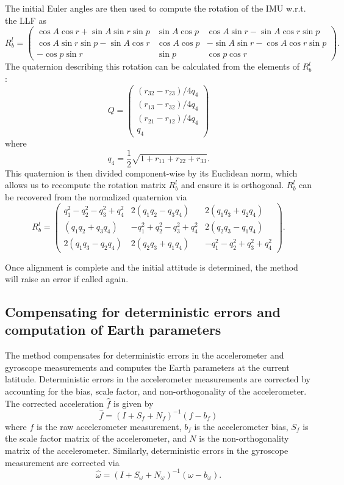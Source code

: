 \documentclass[11pt, oneside]{article}   	%
\begin{document}
The initial Euler angles are then used to compute the rotation of the IMU w.r.t. the LLF as
$$ R_b^l=\begin{pmatrix}
\cos A \cos r + \sin A \sin r \sin p & \sin A \cos p & \cos A \sin r - \sin A \cos r \sin p \\
\cos A \sin r \sin p - \sin A \cos r & \cos A \cos p & -\sin A \sin r - \cos A \cos r \sin p \\
-\cos p \sin r & \sin p & \cos p \cos r
\end{pmatrix}.$$
The quaternion describing this rotation can be calculated from the elements of $R_b^l$:
$$Q=\begin{pmatrix}
(r_{32}-r_{23})/4q_4 \\
(r_{13}-r_{32})/4q_4 \\
(r_{21}-r_{12})/4q_4 \\
q_4
\end{pmatrix}$$
where
$$q_4=\frac12\sqrt{1+r_{11}+r_{22}+r_{33}}.$$
This quaternion is then divided component-wise by its Euclidean norm, which allows us to recompute the rotation matrix $R_b^l$ and ensure it is orthogonal.  $R_b^l$ can be recovered from the normalized quaternion via
$$ R_b^l=\begin{pmatrix}
q_1^2-q_2^2-q_3^2+q_4^2 & 2(q_1q_2-q_3q_4) & 2(q_1q_3+q_2q_4) \\
(q_1q_2+q_3q_4) & -q_1^2+q_2^2-q_3^2+q_4^2 & 2(q_2q_3-q_1q_4) \\
2(q_1q_3-q_2q_4) &  2(q_2q_3+q_1q_4) & -q_1^2-q_2^2+q_3^2+q_4^2
\end{pmatrix}.$$

Once alignment is complete and the initial attitude is determined, the  method will raise an error if called again.

\subsection{Compensating for deterministic errors and computation of Earth parameters}
The  method compensates for deterministic errors in the accelerometer and gyroscope measurements and computes the Earth parameters at the current latitude.  Deterministic errors in the accelerometer measurements are corrected by accounting for the bias, scale factor, and non-orthogonality of the accelerometer.  The corrected acceleration $\hat f$ is given by $$\hat f=(I+S_f+N_f)^{-1}(f-b_f)$$ where $f$ is the raw accelerometer measurement, $b_f$ is the accelerometer bias, $S_f$ is the scale factor matrix of the accelerometer, and $N$ is the non-orthogonality matrix of the accelerometer.  Similarly, deterministic errors in the gyroscope measurement are corrected via $$\hat \omega=(I+S_\omega+N_\omega)^{-1}(\omega-b_\omega).$$
\end{document}

